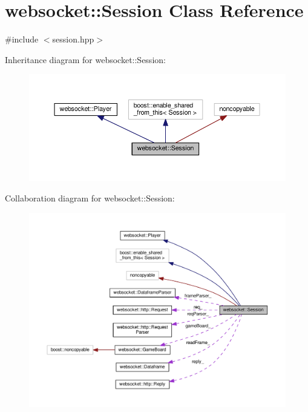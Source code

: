 \hypertarget{classwebsocket_1_1Session}{}\section{websocket\+:\+:Session Class Reference}
\label{classwebsocket_1_1Session}


{\ttfamily \#include $<$session.\+hpp$>$}



Inheritance diagram for websocket\+:\+:Session\+:\nopagebreak
\begin{figure}[H]
\begin{center}
\leavevmode
\includegraphics[width=350pt]{classwebsocket_1_1Session__inherit__graph}
\end{center}
\end{figure}


Collaboration diagram for websocket\+:\+:Session\+:
\nopagebreak
\begin{figure}[H]
\begin{center}
\leavevmode
\includegraphics[width=350pt]{classwebsocket_1_1Session__coll__graph}
\end{center}
\end{figure}
